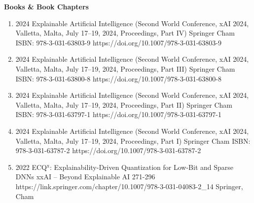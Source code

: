 \headedsection %
{\bf Books \& Book Chapters}{}
{
    \begin{enumerate}

        \item {}
                        {2024}
                        {Explainable Artificial Intelligence (Second World Conference, xAI 2024, Valletta, Malta, July 17–19, 2024, Proceedings, Part IV)}
                        {Springer}
                        {Cham}
                        {ISBN: 978-3-031-63803-9}
                        {https://doi.org/10.1007/978-3-031-63803-9}

        \item {}
                        {2024}
                        {Explainable Artificial Intelligence (Second World Conference, xAI 2024, Valletta, Malta, July 17–19, 2024, Proceedings, Part III)}
                        {Springer}
                        {Cham}
                        {ISBN: 978-3-031-63800-8}
                        {https://doi.org/10.1007/978-3-031-63800-8}

        \item {}
                        {2024}
                        {Explainable Artificial Intelligence (Second World Conference, xAI 2024, Valletta, Malta, July 17–19, 2024, Proceedings, Part II)}
                        {Springer}
                        {Cham}
                        {ISBN: 978-3-031-63797-1}
                        {https://doi.org/10.1007/978-3-031-63797-1}

        \item {}
                        {2024}
                        {Explainable Artificial Intelligence (Second World Conference, xAI 2024, Valletta, Malta, July 17–19, 2024, Proceedings, Part I)}
                        {Springer}
                        {Cham}
                        {ISBN: 978-3-031-63787-2}
                        {https://doi.org/10.1007/978-3-031-63787-2}

        \item {}
                            {2022}
                            {ECQ$^{\textrm{x}}$: Explainability-Driven Quantization for Low-Bit and Sparse DNNs}
                            {xxAI -- Beyond Explainable AI}
                            {271-296}
                            {https://link.springer.com/chapter/10.1007/978-3-031-04083-2_14}
                            {Springer, Cham}


\end{enumerate}}
